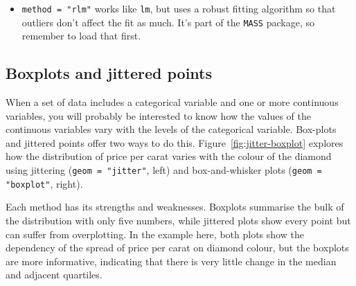 \begin{itemize}
    

  \item {\tt method = "rlm"} works like {\tt lm}, but uses a robust fitting algorithm so that outliers don't affect the fit as much.  It's part of the {\tt MASS} package, so remember to load that first.  

\end{itemize}

\subsection{Boxplots and jittered points}
\label{sub:boxplot}

When a set of data includes a categorical variable and one or more continuous variables, you will probably be interested to know how the values of the continuous variables vary with the levels of the categorical variable.  Box-plots and jittered points offer two ways to do this.  Figure~\ref{fig:jitter-boxplot} explores how the distribution of price per carat varies with the colour of the diamond using jittering ({\tt geom = "jitter"}, left) and box-and-whisker plots ({\tt geom = "boxplot"}, right).   

% 


Each method has its strengths and weaknesses. Boxplots summarise the bulk of the distribution with only five numbers, while jittered plots show every point but can suffer from overplotting. In the example here, both plots show the dependency of the spread of price per carat on diamond colour, but the boxplots are more informative, indicating that there is very little change in the median and adjacent quartiles.

